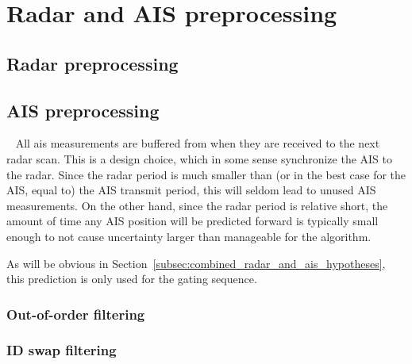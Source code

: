 
\chapter{Radar and AIS preprocessing}\label{chapter:radar-and-ais-preprocessing}

\section{Radar preprocessing}


\section{AIS preprocessing}~\label{sec:ais_preprocessing}
All \gls{ais} measurements are buffered from when they are received to the next radar scan. This is a design choice, which in some sense synchronize the AIS to the radar. Since the radar period is much smaller than (or in the best case for the AIS, equal to) the AIS transmit period, this will seldom lead to unused AIS measurements. On the other hand, since the radar period is relative short, the amount of time any AIS position will be predicted forward is typically small enough to not cause uncertainty larger than manageable for the algorithm. 

As will be obvious in Section~\ref{subsec:combined_radar_and_ais_hypotheses}, this prediction is only used for the gating sequence.

\subsection{Out-of-order filtering}

\subsection{ID swap filtering}